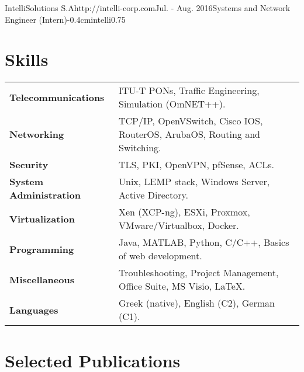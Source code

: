 \documentclass{mycv}
\begin{document}
	\vspace*{0.75cm}	

	\begin{EntryDatedLogo}{IntelliSolutions S.A}{http://intelli-corp.com}{Jul. - Aug. 2016}{Systems and Network Engineer (Intern)}{-0.4cm}{intelli}{0.75}
	\end{EntryDatedLogo}
	\newpage
	\section{Skills}
	\begin{tabular}{m{4.5cm} m{13cm}}\renewcommand{\arraystretch}{2}
		\textbf{Telecommunications}   	& ITU-T PONs, Traffic Engineering, Simulation (OmNET++). \\
		\textbf{Networking}   			& TCP/IP, OpenVSwitch, Cisco IOS, RouterOS, ArubaOS, Routing and Switching.\\
		\textbf{Security}				& TLS, PKI, OpenVPN, pfSense, ACLs. \\
		\textbf{System Administration}	& Unix, LEMP stack, Windows Server, Active Directory. \\
		\textbf{Virtualization}			& Xen (XCP-ng), ESXi, Proxmox, VMware/Virtualbox, Docker.\\ 
		\textbf{Programming} 	    	& Java, MATLAB, Python, C/C++, Basics of web development. \\
		\textbf{Miscellaneous}			& Troubleshooting, Project Management, Office Suite, MS Visio, \LaTeX. \\
		\textbf{Languages} 				& Greek (native), English (C2), German (C1). 
	\end{tabular}
	
	\section{Selected Publications}
	
\end{document}
